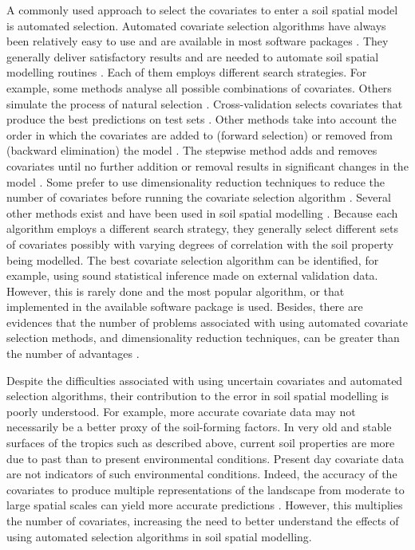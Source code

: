 A commonly used approach to select the covariates to enter a soil spatial model is automated selection. 
Automated covariate selection algorithms have always been relatively easy to use \cite{DraperEtAl1971} and are 
available in most software packages \cite{Harrell2001a}. They generally deliver satisfactory results and are 
needed to automate soil spatial modelling routines \cite{HenglEtAl2014}. Each of them employs different search 
strategies. For example, some methods analyse all possible combinations of covariates. Others simulate the 
process of natural selection \cite{AndersenEtAl2010}. Cross-validation selects covariates that produce the best 
predictions on test sets \cite{GuyonEtAl2003}. Other methods take into account the order in which the 
covariates are added to (forward selection) or removed from (backward elimination) the model 
\cite{LarkEtAl2007a}. The stepwise method adds and removes covariates until no further addition or removal 
results in significant changes in the model \cite{DraperEtAl1998}. Some prefer to use dimensionality reduction 
techniques to reduce the number of covariates \cite{Massy1965} before running the covariate selection algorithm 
\cite{tenCatenEtAl2011a, HenglEtAl2014}. Several other methods exist and have been used in soil spatial 
modelling \cite{PoggioEtAl2013, NussbaumEtAl2014}. Because each algorithm employs a different search 
strategy, they generally select different sets of covariates possibly with varying degrees of correlation 
with the soil property being modelled. The best covariate selection algorithm can be identified, for example, 
using sound statistical inference made on external validation data. However, this is rarely done and the most 
popular algorithm, or that implemented in the available software package is used. Besides, there are evidences 
that the number of problems associated with using automated covariate selection methods, and dimensionality 
reduction techniques, can be greater than the number of advantages \cite{FarrarEtAl1967, Jackson1993, 
Chatfield1995, Edirisooriya1995, Harrell2001a, Jolliffe2002, Peres-NetoEtAl2005, LarkEtAl2007a, Ratner2010}.

Despite the difficulties associated with using uncertain covariates and automated selection algorithms, 
their contribution to the error in soil spatial modelling is poorly understood. For example, more accurate 
covariate data may not necessarily be a better proxy of the soil-forming factors. In very old and stable 
surfaces of the tropics such as described above, current soil properties are more due to past than to present 
environmental conditions. Present day covariate data are not indicators of such environmental conditions. 
Indeed,  the accuracy of the covariates to produce multiple representations of the landscape from 
moderate to large spatial scales can yield more accurate predictions \cite{BehrensEtAl2010a}. However, this 
multiplies the number of covariates, increasing the need to better understand the effects of using automated 
selection algorithms in soil spatial modelling.

